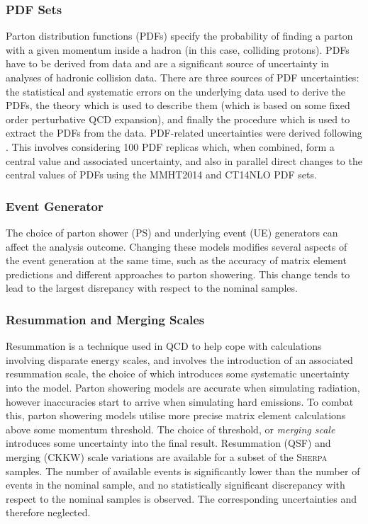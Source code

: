 \subsubsection{PDF Sets}

Parton distribution functions (PDFs) specify the probability of finding a parton with a given momentum inside a hadron (in this case, colliding protons).
PDFs have to be derived from data and are a significant source of uncertainty in analyses of hadronic collision data.
There are three sources of PDF uncertainties: the statistical and systematic errors on the underlying data used to derive the PDFs, the theory which is used to describe them (which is based on some fixed order perturbative QCD expansion), and finally the procedure which is used to extract the PDFs from the data. 
PDF-related uncertainties were derived following .
This involves considering 100 PDF replicas which, when combined, form a central value and associated uncertainty, and also in parallel direct changes to the central values of PDFs using the MMHT2014 \cite{Harland-Lang:2014zoa} and CT14NLO \cite{Dulat:2015mca} PDF sets.

\subsubsection{Event Generator}

The choice of parton shower (PS) and underlying event (UE) generators can affect the analysis outcome.
Changing these models modifies several aspects of the event generation at the same time, such as the accuracy of matrix element predictions and different approaches to parton showering.
This change tends to lead to the largest disrepancy with respect to the nominal samples.

\subsubsection{Resummation and Merging Scales}

Resummation is a technique used in QCD to help cope with calculations involving disparate energy scales, and involves the introduction of an associated resummation scale, the choice of which introduces some systematic uncertainty into the model.
Parton showering models are accurate when simulating \lowpt radiation, however inaccuracies start to arrive when simulating hard emissions.
To combat this, parton showering models utilise more precise matrix element calculations above some momentum threshold.
The choice of threshold, or \textit{merging scale} introduces some uncertainty into the final result.
Resummation (QSF) and merging (CKKW) scale variations are available for a subset of the \textsc{Sherpa} samples.
The number of available events is significantly lower than the number of events in the nominal sample, and no statistically significant discrepancy with respect to the nominal samples is observed.
The corresponding uncertainties and therefore neglected.

